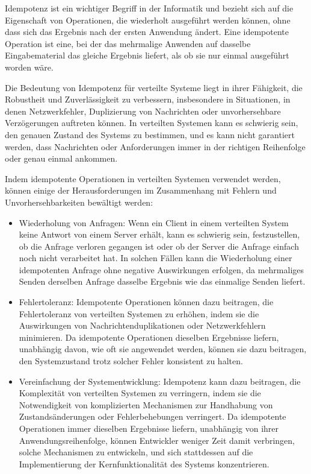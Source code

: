 \documentclass[../vs-script-first-v01.tex]{subfiles}
\begin{document}
Idempotenz ist ein wichtiger Begriff in der Informatik und bezieht sich auf die Eigenschaft von Operationen, die wiederholt ausgeführt werden können, ohne dass sich das Ergebnis nach der ersten Anwendung ändert. Eine idempotente Operation ist eine, bei der das mehrmalige Anwenden auf dasselbe Eingabematerial das gleiche Ergebnis liefert, als ob sie nur einmal ausgeführt worden wäre.

Die Bedeutung von Idempotenz für verteilte Systeme liegt in ihrer Fähigkeit, die Robustheit und Zuverlässigkeit zu verbessern, insbesondere in Situationen, in denen Netzwerkfehler, Duplizierung von Nachrichten oder unvorhersehbare Verzögerungen auftreten können. In verteilten Systemen kann es schwierig sein, den genauen Zustand des Systems zu bestimmen, und es kann nicht garantiert werden, dass Nachrichten oder Anforderungen immer in der richtigen Reihenfolge oder genau einmal ankommen.

Indem idempotente Operationen in verteilten Systemen verwendet werden, können einige der Herausforderungen im Zusammenhang mit Fehlern und Unvorhersehbarkeiten bewältigt werden:
\begin{itemize}
\item Wiederholung von Anfragen: Wenn ein Client in einem verteilten System keine Antwort von einem Server erhält, kann es schwierig sein, festzustellen, ob die Anfrage verloren gegangen ist oder ob der Server die Anfrage einfach noch nicht verarbeitet hat. In solchen Fällen kann die Wiederholung einer idempotenten Anfrage ohne negative Auswirkungen erfolgen, da mehrmaliges Senden derselben Anfrage dasselbe Ergebnis wie das einmalige Senden liefert.
\item Fehlertoleranz: Idempotente Operationen können dazu beitragen, die Fehlertoleranz von verteilten Systemen zu erhöhen, indem sie die Auswirkungen von Nachrichtenduplikationen oder Netzwerkfehlern minimieren. Da idempotente Operationen dieselben Ergebnisse liefern, unabhängig davon, wie oft sie angewendet werden, können sie dazu beitragen, den Systemzustand trotz solcher Fehler konsistent zu halten.
\item Vereinfachung der Systementwicklung: Idempotenz kann dazu beitragen, die Komplexität von verteilten Systemen zu verringern, indem sie die Notwendigkeit von komplizierten Mechanismen zur Handhabung von Zustandsänderungen oder Fehlerbehebungen verringert. Da idempotente Operationen immer dieselben Ergebnisse liefern, unabhängig von ihrer Anwendungsreihenfolge, können Entwickler weniger Zeit damit verbringen, solche Mechanismen zu entwickeln, und sich stattdessen auf die Implementierung der Kernfunktionalität des Systems konzentrieren.
\end{itemize}
\end{document}
